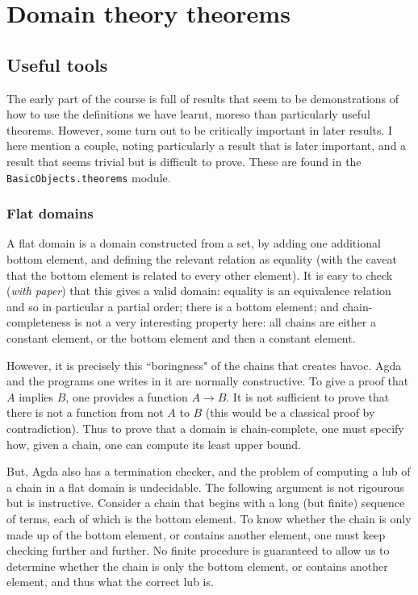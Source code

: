 \documentclass[12pt,a4paper,twoside,openright]{report}
\begin{document}
\section{Domain theory theorems}
\subsection{Useful tools}
The early part of the course is full of results that seem to be demonstrations of how to use the definitions we have learnt, moreso than particularly useful theorems. However, some turn out to be critically important in later results. I here mention a couple, noting particularly a result that is later important, and a result that seems trivial but is difficult to prove. These are found in the \texttt{BasicObjects.theorems} module.
\subsubsection{Flat domains}
A flat domain is a domain constructed from a set, by adding one additional bottom element, and defining the relevant relation as equality (with the caveat that the bottom element is related to every other element). It is easy to check (\textit{with paper}) that this gives a valid domain: equality is an equivalence relation and so in particular a partial order; there is a bottom element; and chain-completeness is not a very interesting property here: all chains are either a constant element, or the bottom element and then a constant element.

However, it is precisely this ``boringness" of the chains that creates havoc. Agda and the programs one writes in it are normally constructive. To give a proof that $A$ implies $B$, one provides a function $A \to B$. It is not sufficient to prove that there is not a function from not $A$ to $B$ (this would be a classical proof by contradiction). Thus to prove that a domain is chain-complete, one must specify how, given a chain, one can compute its least upper bound. 

But, Agda also has a termination checker, and the problem of computing a lub of a chain in a flat domain is undecidable. The following argument is not rigourous but is instructive. Consider a chain that begins with a long (but finite) sequence of terms, each of which is the bottom element. To know whether the chain is only made up of the bottom element, or contains another element, one must keep checking further and further. No finite procedure is guaranteed to allow us to determine whether the chain is only the bottom element, or contains another element, and thus what the correct lub is. 
\end{document}
